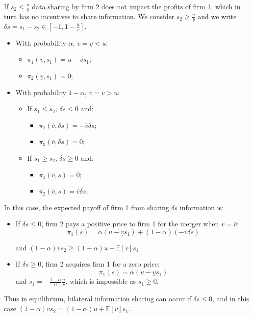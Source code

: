 \documentclass[a4paper,leqno]{article}%
\newcommand{\E}{\mathbb E}
\renewcommand{\a}{\alpha}
\newcommand{\uv}{\underline{v}}
\newcommand{\ov}{\overline{v}}
\begin{document}
If $s_2\leq \frac{u}{\ov}$ data sharing by firm 2 does not impact the profits of firm 1, which in turn has no incentives to share information. We consider $s_2\geq \frac{u}{\ov}$ and we write $\delta s=s_1-s_2\in [-1,1-\frac{u}{\ov}]$.

%
\begin{itemize}
    \item With probability $\a$, $v=\uv<u$:
\begin{itemize}
    \item $\pi_1(\uv,s_1)=u-\uv s_1$;
    \item $\pi_2(\uv,s_1)=0$;
\end{itemize}
    \item With probability $1-\a$, $v=\ov>u$:
\begin{itemize}
    \item If $ s_1\leq s_2$, $\delta s\leq 0$ and:
\begin{itemize}
    \item $\pi_1(\ov,\delta s)=-\ov \delta s$;
    \item $\pi_2(\ov,\delta s)=0$;
\end{itemize}    
    \item If $s_1\geq s_2$, $\delta s\geq 0$ and:
\begin{itemize}
    \item $\pi_1(\ov,s)=0$;
    \item $\pi_2(\ov,s)=\ov \delta s$;
\end{itemize}
\end{itemize}
\end{itemize}

In this case, the expected payoff of firm 1 from sharing $\delta s$ information is:

\begin{itemize}
    \item If $\delta s\leq 0$, firm 2 pays a positive price to firm 1 for the merger when $v=\ov$:
    $$\pi_1(s)=\a(u-\uv s_1)+(1-\a)(-\ov \delta s)$$
    
    and $(1-\a)\ov s_2 \geq (1-\a)u+\E[v]s_1$
    \item If $\delta s\geq 0$, firm 2 acquires firm 1 for a zero price:
    $$\pi_1(s)=\a(u-\uv s_1)$$
    and $s_1=-\frac{1-\a}{\a}\frac{u}{\uv}$, which is impossible as $s_1 \geq 0$.
\end{itemize}

Thus in equilibrium, bilateral information sharing can occur if $\delta s\leq0$, and in this case $(1-\a)\ov s_2 = (1-\a)u+\E[v]s_1$.
\end{document}

